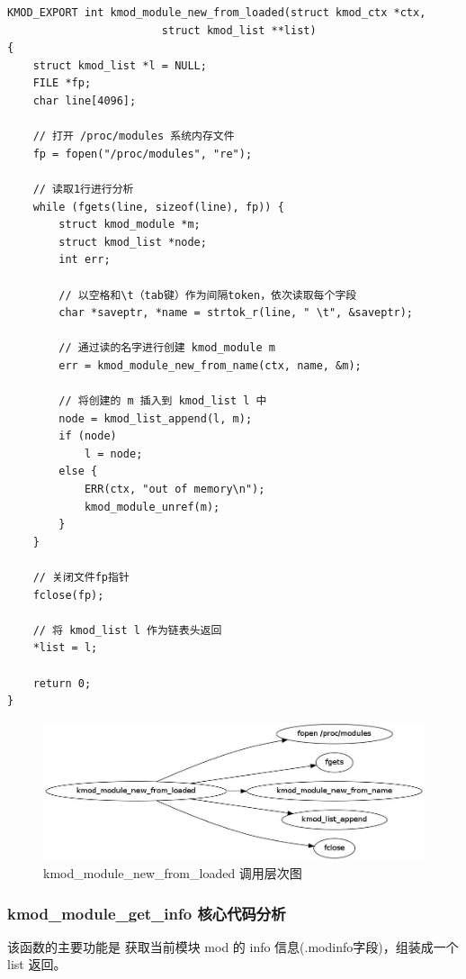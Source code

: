 \documentclass[11pt,a4paper]{article}
\makeatletter
\def\maxwidth{\ifdim\Gin@nat@width>\linewidth\linewidth
\else\Gin@nat@width\fi}
\let\Oldincludegraphics\includegraphics
\renewcommand{\includegraphics}[1]{\Oldincludegraphics[width=\maxwidth]{#1}}
\makeatother
\begin{document}
{\begin{shaded}\begin{verbatim}
KMOD_EXPORT int kmod_module_new_from_loaded(struct kmod_ctx *ctx,
                        struct kmod_list **list)
{
    struct kmod_list *l = NULL;
    FILE *fp;
    char line[4096];

    // 打开 /proc/modules 系统内存文件
    fp = fopen("/proc/modules", "re");

    // 读取1行进行分析
    while (fgets(line, sizeof(line), fp)) {
        struct kmod_module *m;
        struct kmod_list *node;
        int err;

        // 以空格和\t（tab键）作为间隔token，依次读取每个字段
        char *saveptr, *name = strtok_r(line, " \t", &saveptr);

        // 通过读的名字进行创建 kmod_module m
        err = kmod_module_new_from_name(ctx, name, &m);

        // 将创建的 m 插入到 kmod_list l 中
        node = kmod_list_append(l, m);
        if (node)
            l = node;
        else {
            ERR(ctx, "out of memory\n");
            kmod_module_unref(m);
        }
    }

    // 关闭文件fp指针
    fclose(fp);

    // 将 kmod_list l 作为链表头返回
    *list = l;

    return 0;
}
\end{verbatim}\end{shaded}}
\begin{figure}[htbp]
\centering
\includegraphics{./figures/kmod_module_new_from_loaded.jpg}
\caption{kmod\_module\_new\_from\_loaded 调用层次图}
\end{figure}

\subsubsection{kmod\_module\_get\_info 核心代码分析}

该函数的主要功能是 获取当前模块 mod 的 info
信息(.modinfo字段)，组装成一个 list 返回。
\end{document}

